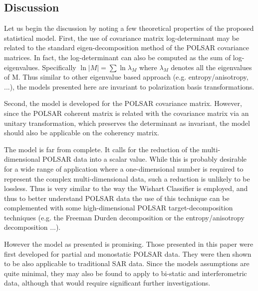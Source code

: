 \documentclass[journal]{IEEEtran}
\begin{document}
\subsection{Discussion}

Let us begin the discussion by noting a few theoretical properties of the proposed statistical model.
First, the use of covariance matrix log-determinant may be related to the standard eigen-decomposition method of the POLSAR covariance matrices.
In fact, the log-determinant can also be computed as the sum of log-eigenvalues.
Specifically $\ln{|M|} = \sum \ln{\lambda_M}$ where $\lambda_M$ denotes all the eigenvalues of M.
Thus similar to other eigenvalue based approach (e.g. entropy/anisotropy, ...),
  the models presented here are invariant to polarization basis transformations.

Second, the model is developed for the POLSAR covariance matrix.
However, since the POLSAR coherent matrix is related with the covariance matrix via an unitary transformation, which preserves the determinant as invariant,
the model should also be applicable on the coherency matrix.

The model is far from complete.
 It calls for the reduction of the multi-dimensional POLSAR data into a scalar value.
While this is probably desirable for a wide range of application where a one-dimensional number is required to represent the complex multi-dimensional data,
  such a reduction is unlikely to be lossless.
Thus is very similar to the way the Wishart Classifier is employed, and thus to better understand POLSAR data
  the use of this technique can be complemented with some high-dimensional POLSAR target-decomposition techniques (e.g. the Freeman Durden decomposition \cite{Freeman_1998_TGRS_963} or the entropy/anisotropy decomposition \cite{Cloude_1997_TGRS_68} ...).

However the model as presented is promising. Those presented in this paper were first developed for partial and monostatic POLSAR data.
They were then shown to be also applicable to traditional SAR data.
Since the models assumptions are quite minimal, they may also be found to apply to bi-static and interferometric data, although that would require significant further investigations.
\end{document}

